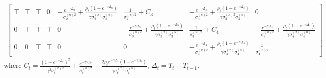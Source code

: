\begin{landscape}
\begin{align*}
\begin{bmatrix}
  \top &  \top & \top& 0 & -\frac{e^{-\gamma\Delta_2}}{\sigma_2^{(u)2}}+\frac{\rho_{t}(1-e^{-\gamma\Delta_2})}{\gamma\sigma_2^{(x)}\sigma_2^{(u)}}   & \frac{1}{\sigma_2^{(u)2}}+C_3 & -\frac{e^{-\gamma\Delta_3}}{\sigma_3^{(u)2}}+\frac{\rho_{t}(1-e^{-\gamma\Delta_3})}{\gamma\sigma_3^{(x)2}\sigma_3^{(u)}} & 0 \\
  0 &\top&\top & \top& 0 & -\frac{e^{-\gamma\Delta_3}}{\sigma_3^{(u)2}}+\frac{\rho_{t}(1-e^{-\gamma\Delta_3})}{\gamma\sigma_3^{(x)}\sigma_3^{(u)}}  & \frac{1}{\sigma_3^{(u)2}}+C_4 & -\frac{e^{-\gamma\Delta_4}}{\sigma_4^{(u)2}}+\frac{\rho_{t}(1-e^{-\gamma\Delta_4})}{\gamma\sigma_4^{(x)}\sigma_4^{(u)}}  \\
  0 & 0 & \top&\top& 0 & 0 & -\frac{e^{-\gamma\Delta_4}}{\sigma_4^{(u)2}}+\frac{\rho_{t}(1-e^{-\gamma\Delta_4})}{\gamma\sigma_4^{(x)}\sigma_4^{(u)}}  & \frac{1}{\sigma_4^{(u)2}}
\end{bmatrix}
\end{align*}
\normalsize
where $C_t = \frac{ (1-e^{-\gamma\Delta_t})^2 }{\gamma^2\sigma_t^{(x)2}}  + \frac{ e^{-2\gamma\Delta_t}}{\sigma_t^{(u)2}} - \frac{2\rho_{t} e^{-\gamma\Delta_t} (1-e^{-\gamma\Delta_t}) }{ \gamma \sigma_t^{(x)}\sigma_t^{(u)}}$, $\Delta_t = T_t-T_{t-1}$.
\end{landscape}

